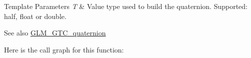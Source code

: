 \begin{DoxyTemplParams}{Template Parameters}
{\em T} & Value type used to build the quaternion. Supported\+: half, float or double. \\
\hline
\end{DoxyTemplParams}
\begin{DoxySeeAlso}{See also}
\hyperlink{group__gtc__quaternion}{G\+L\+M\+\_\+\+G\+T\+C\+\_\+quaternion} 
\end{DoxySeeAlso}


Here is the call graph for this function\+:


